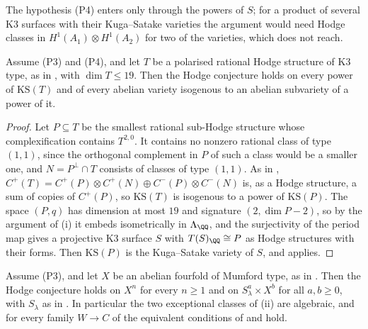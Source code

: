 The hypothesis (P4) enters only through the powers of $S$; for a product of
several K3 surfaces with their Kuga--Satake varieties the argument would need
Hodge classes in $H^{1}(A_{1})\otimes H^{1}(A_{2})$ for two of the
varieties, which  does not reach.

\begin{corollary}\label{cor:kstype}
Assume \textup{(P3)} and \textup{(P4)}, and let $T$ be a polarised rational
Hodge structure of K3 type, as in , with $\dim T\le19$.
Then the Hodge conjecture holds on every power of $\mathrm{KS}(T)$ and of
every abelian variety isogenous to an abelian subvariety of a power of it.
\end{corollary}

\begin{proof}
Let $P\subseteq T$ be the smallest rational sub-Hodge structure whose
complexification contains $T^{2,0}$. It contains no nonzero rational class
of type $(1,1)$, since the orthogonal complement in $P$ of such a class
would be a smaller one, and $N=P^{\perp}\cap T$ consists of classes of type
$(1,1)$. As in ,
$C^{+}(T)=C^{+}(P)\otimes C^{+}(N)\oplus C^{-}(P)\otimes C^{-}(N)$ is, as a
Hodge structure, a sum of copies of $C^{+}(P)$, so $\mathrm{KS}(T)$ is
isogenous to a power of $\mathrm{KS}(P)$. The space $(P,q)$ has dimension at
most $19$ and signature $(2,\dim P-2)$, so by the argument of
(i) it embeds isometrically in $\Lambda_{\QQ}$, and the
surjectivity of the period map gives a projective K3 surface $S$ with
$T(S)_{\QQ}\cong P$ as Hodge structures with their forms. Then
$\mathrm{KS}(P)$ is the Kuga--Satake variety of $S$, and
 applies.
\end{proof}

\begin{corollary}\label{cor:mumfordall}
Assume \textup{(P3)}, and let $X$ be an abelian fourfold of Mumford type, as
in . Then the Hodge conjecture holds on $X^{n}$ for every
$n\ge1$ and on $S_{\lambda}^{a}\times X^{b}$ for all $a,b\ge0$, with
$S_{\lambda}$ as in . In particular the two exceptional
classes of (ii) are algebraic, and for every family
$W\to C$ of  the equivalent conditions of
 and  hold.
\end{corollary}

